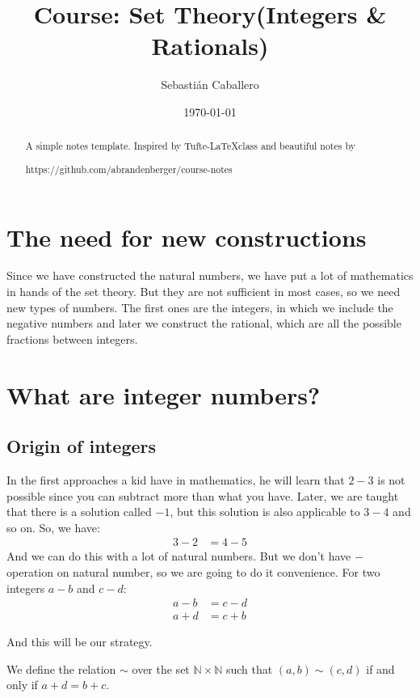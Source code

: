 \documentclass{tufte-handout}
\title{Course: Set Theory(Integers \& Rationals)}
\author{Sebastián Caballero}
\date{\today}
\begin{document}
\maketitle

\begin{abstract}
\noindent
A simple notes template. Inspired by Tufte-\LaTeX class and beautiful notes by \begin{verbatim*}
	https://github.com/abrandenberger/course-notes
\end{verbatim*}
\end{abstract}
\section{The need for new constructions}
Since we have constructed the natural numbers, we have put a lot of mathematics in hands of the set theory. But they are not sufficient in most cases, so we need new types of numbers. The first ones are the integers, in which we include the negative numbers and later we construct the rational, which are all the possible fractions between integers.

\section{What are integer numbers?}
\subsection{Origin of integers}
In the first approaches a kid have in mathematics, he will learn that $2-3$ is not possible since you can subtract more than what you have. Later, we are taught that there is a solution called $-1$, but this solution is also applicable to $3-4$ and so on. So, we have:
\begin{align*}
	3 - 2 &= 4 - 5
\end{align*}
And we can do this with a lot of natural numbers. But we don't have $-$ operation on natural number, so we are going to do it convenience. For two integers $a-b$ and $c-d$:
\begin{align*}
	a - b &= c - d\\
	a + d &= c + b
\end{align*}

And this will be our strategy.

\begin{definition}
	We define the relation $\sim$ over the set $\mathbb{N} \times \mathbb{N}$ such that $(a, b) \sim (c, d)$ if and only if $a + d = b + c$.
\end{definition}
\end{document}
